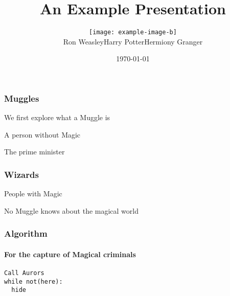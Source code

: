 \documentclass[aspectratio=169]{beamer}
\begin{document}
\newcommand{\makeauthors}{\begin{center}
\begin{tabular}{>{\centering\arraybackslash}m{3.3cm}>{\centering\arraybackslash}m{3.3cm}>{\centering\arraybackslash}m{3.3cm}}

\livlogowhite{2.7cm}
&
\centering\texttt{[image: example-image-b]} &
\livlogowhite{2.7cm} \\
  Ron Weasley &  Harry Potter &  Hermiony Granger 
\end{tabular}
\end{center}}


 \title{An Example Presentation}
\author[Ron Weasley]{\makeauthors}
\institute[Liverpool]{}
 
\date{\today}
 


\begin{frame}
\maketitle

\end{frame}


 
\begin{frame}
\frametitle{Muggles}
We first explore what a Muggle is 

\begin{definition}[Muggle]
A person without Magic

\end{definition}


\begin{example}[Muggle]
The prime minister

\end{example}
\end{frame}

 
\begin{frame}
\frametitle{Wizards}
\begin{definition}[Wizards]
People with Magic
\end{definition} 

\pause
\begin{theorem}
No Muggle knows about the magical world
\end{theorem} 

\end{frame}

\begin{frame}[fragile]
\frametitle{Algorithm}
\framesubtitle{For the capture of Magical criminals}

\begin{lstlisting}[mathescape=true]
Call Aurors
while not(here):
  hide
\end{lstlisting}


\end{frame}
\end{document}
